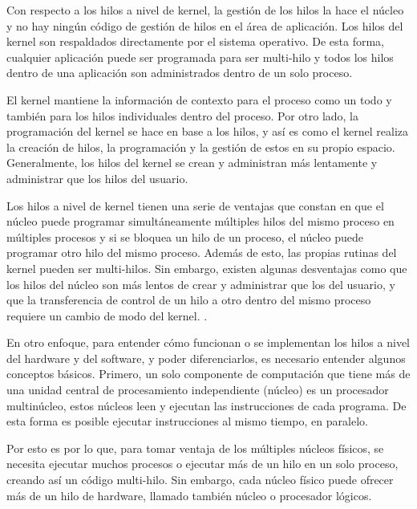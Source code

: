 \documentclass[12pt]{article}
\begin{document}
{Con respecto a los hilos a nivel de kernel, la gestión de los hilos la hace el núcleo y no hay ningún código de gestión de hilos en el área de aplicación. Los hilos del kernel son respaldados directamente por el sistema operativo. De esta forma, cualquier aplicación puede ser programada para ser multi-hilo y todos los hilos dentro de una aplicación son administrados dentro de un solo proceso.
\newline

El kernel mantiene la información de contexto para el proceso como un todo y también para los hilos individuales dentro del proceso. Por otro lado, la programación del kernel se hace en base a los hilos, y así es como el kernel realiza la creación de hilos, la programación y la gestión de estos en su propio espacio. Generalmente, los hilos del kernel se crean y administran más lentamente y administrar que los hilos del usuario.
\newline

Los hilos a nivel de kernel tienen una serie de ventajas que constan en que el núcleo puede programar simultáneamente múltiples hilos del mismo proceso en múltiples procesos y si se bloquea un hilo de un proceso, el núcleo puede programar otro hilo del mismo proceso. Además de esto, las propias rutinas del kernel pueden ser multi-hilos. Sin embargo, existen algunas desventajas como que los hilos del núcleo son más lentos de crear y administrar que los del usuario, y que la transferencia de control de un hilo a otro dentro del mismo proceso requiere un cambio de modo del kernel. \citep{Tip}.
\newline

En otro enfoque, para entender cómo funcionan o se implementan los hilos a nivel del hardware y del software, y poder diferenciarlos, es necesario entender algunos conceptos básicos. Primero, un solo componente de computación que tiene más de una unidad central de procesamiento independiente (núcleo) es un procesador multinúcleo, estos núcleos leen y ejecutan las instrucciones de cada programa. De esta forma es posible ejecutar instrucciones al mismo tiempo, en paralelo.
\newline

Por esto es por lo que, para tomar ventaja de los múltiples núcleos físicos, se necesita ejecutar muchos procesos o ejecutar más de un hilo en un solo proceso, creando así un código multi-hilo. Sin embargo, cada núcleo físico puede ofrecer más de un hilo de hardware, llamado también núcleo o procesador lógicos.
\newline

}
\end{document}
